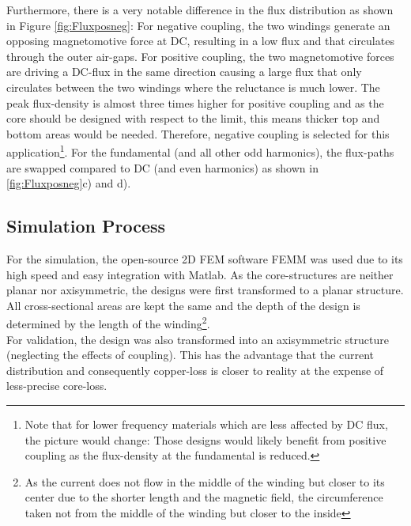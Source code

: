 \documentclass{IPEC2026}
\newcommand{\sbl}[1]{\glssymbol{#1}}
\begin{document}
Furthermore, there is a very notable difference in the flux distribution as shown in Figure \ref{fig:Fluxposneg}: For negative coupling, the two windings generate an opposing magnetomotive force at DC, resulting in a low flux and that circulates through the outer air-gaps. For positive coupling, the two magnetomotive forces are driving a DC-flux in the same direction causing a large flux that only circulates between the two windings where the reluctance is much lower. The peak flux-density is almost three times higher for positive coupling and as the core should be designed with respect to the \sbl{Hdc} limit, this means thicker top and bottom areas would be needed. Therefore, negative coupling is selected for this application\footnote{Note that for lower frequency materials which are less affected by DC flux, the picture would change: Those designs would likely benefit from positive coupling as the flux-density at the fundamental is reduced.}. For the fundamental (and all other odd harmonics), the flux-paths are swapped compared to DC (and even harmonics) as shown in \ref{fig:Fluxposneg}c) and d).

\subsection{Simulation Process}
For the simulation, the open-source 2D FEM software FEMM was used due to its high speed and easy integration with Matlab. As the core-structures are neither planar nor axisymmetric, the designs were first transformed to a planar structure. All cross-sectional areas are kept the same and the depth of the design is determined by the length of the winding\footnote{As the current does not flow in the middle of the winding but closer to its center due to the shorter length and the magnetic field, the circumference taken not from the middle of the winding but closer to the inside}. \\
For validation, the design was also transformed into an axisymmetric structure (neglecting the effects of coupling). This has the advantage that the current distribution and consequently copper-loss is closer to reality at the expense of less-precise core-loss.
\end{document}
